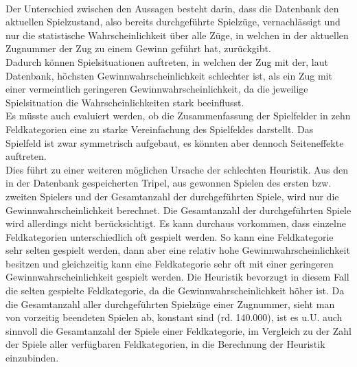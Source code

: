 \\Der Unterschied zwischen den Aussagen besteht darin, dass die Datenbank den aktuellen Spielzustand, also bereits durchgeführte Spielzüge, vernachlässigt und nur die statistische Wahrscheinlichkeit über alle Züge, in welchen in der aktuellen Zugnummer der Zug zu einem Gewinn geführt hat, zurückgibt.
\\Dadurch können Spielsituationen auftreten, in welchen der Zug mit der, laut Datenbank, höchsten Gewinnwahrscheinlichkeit schlechter ist, als ein Zug mit einer vermeintlich geringeren Gewinnwahrscheinlichkeit, da die jeweilige Spielsituation die Wahrscheinlichkeiten stark beeinflusst.
\vspace{0.5cm}
\\Es müsste auch evaluiert werden, ob die Zusammenfassung der Spielfelder in zehn Feldkategorien eine zu starke Vereinfachung des Spielfeldes darstellt. Das Spielfeld ist zwar symmetrisch aufgebaut, es könnten aber dennoch Seiteneffekte auftreten.
\vspace{0.5cm}
\\Dies führt zu einer weiteren möglichen Ursache der schlechten Heuristik. Aus den in der Datenbank gespeicherten Tripel, aus gewonnen Spielen des ersten bzw. zweiten Spielers und der Gesamtanzahl der durchgeführten Spiele, wird nur die Gewinnwahrscheinlichkeit berechnet. Die Gesamtanzahl der durchgeführten Spiele wird allerdings nicht berücksichtigt. Es kann durchaus vorkommen, dass einzelne Feldkategorien unterschiedlich oft gespielt werden. So kann eine Feldkategorie sehr selten gespielt werden, dann aber eine relativ hohe Gewinnwahrscheinlichkeit besitzen und gleichzeitig kann eine Feldkategorie sehr oft mit einer geringeren Gewinnwahrscheinlichkeit gespielt werden. Die Heuristik bevorzugt in diesem Fall die selten gespielte Feldkategorie, da die Gewinnwahrscheinlichkeit höher ist. Da die Gesamtanzahl aller durchgeführten Spielzüge einer Zugnummer, sieht man von vorzeitig beendeten Spielen ab, konstant sind (rd. 140.000), ist es u.U. auch sinnvoll die Gesamtanzahl der Spiele einer Feldkategorie, im Vergleich zu der Zahl der Spiele aller verfügbaren Feldkategorien, in die Berechnung der Heuristik einzubinden.

